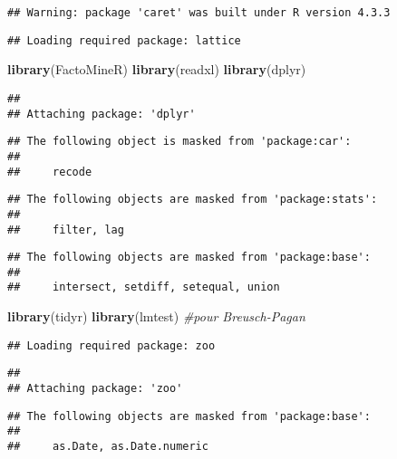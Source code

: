 \documentclass[
]{article}
\newenvironment{Shaded}{\begin{snugshade}}{\end{snugshade}}
\newcommand{\CommentTok}[1]{\textcolor[rgb]{0.56,0.35,0.01}{\textit{#1}}}
\newcommand{\FunctionTok}[1]{\textcolor[rgb]{0.13,0.29,0.53}{\textbf{#1}}}
\newcommand{\NormalTok}[1]{#1}
\begin{document}
\begin{verbatim}
## Warning: package 'caret' was built under R version 4.3.3
\end{verbatim}

\begin{verbatim}
## Loading required package: lattice
\end{verbatim}

\begin{Shaded}
\begin{Highlighting}[]
\FunctionTok{library}\NormalTok{(FactoMineR)}
\FunctionTok{library}\NormalTok{(readxl)}
\FunctionTok{library}\NormalTok{(dplyr)}
\end{Highlighting}
\end{Shaded}

\begin{verbatim}
## 
## Attaching package: 'dplyr'
\end{verbatim}

\begin{verbatim}
## The following object is masked from 'package:car':
## 
##     recode
\end{verbatim}

\begin{verbatim}
## The following objects are masked from 'package:stats':
## 
##     filter, lag
\end{verbatim}

\begin{verbatim}
## The following objects are masked from 'package:base':
## 
##     intersect, setdiff, setequal, union
\end{verbatim}

\begin{Shaded}
\begin{Highlighting}[]
\FunctionTok{library}\NormalTok{(tidyr)}
\FunctionTok{library}\NormalTok{(lmtest) }\CommentTok{\#pour Breusch{-}Pagan}
\end{Highlighting}
\end{Shaded}

\begin{verbatim}
## Loading required package: zoo
\end{verbatim}

\begin{verbatim}
## 
## Attaching package: 'zoo'
\end{verbatim}

\begin{verbatim}
## The following objects are masked from 'package:base':
## 
##     as.Date, as.Date.numeric
\end{verbatim}
\end{document}
